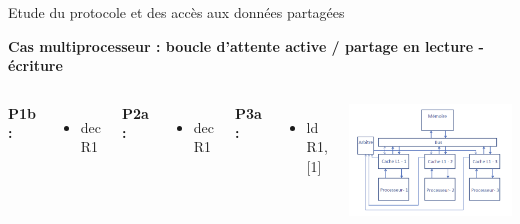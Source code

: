\documentclass{beamer}
\begin{document}
\begin{frame}{Etude du protocole et des accès aux données partagées}
    \addtocounter{framenumber}{-1}
    \textbf{Cas multiprocesseur : boucle d’attente active / partage en lecture - \hspace*{3.8cm} écriture}
    \begin{columns}[c] %

        \textbf{P1b : }
        \begin{itemize}
            \item dec R1
        \end{itemize}

        \textbf{P2a : }
        \begin{itemize}
            \item dec R1
        \end{itemize}

        \textbf{P3a : }
        \begin{itemize}
            \item ld R1, [1]
        \end{itemize}

        \vspace{1cm}
        \includegraphics[scale=0.3]{archi.png}
        
    \end{columns}
\end{frame}
\end{document}
